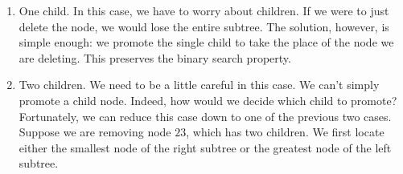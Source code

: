 \begin{enumerate}
\item One child.
In this case, we have to worry about children.
If we were to just delete the node, we would lose the entire subtree.
The solution, however, is simple enough: we promote the single child to take the place of the node we are deleting.
This preserves the binary search property.
\begin{center}
\begin{minipage}{0.3\textwidth}
\end{minipage}
\begin{minipage}{0.2\textwidth}
   \begin{center}
   \end{center}
\end{minipage}
\begin{minipage}{0.3\textwidth}
\end{minipage}
\end{center}
\item Two children.
We need to be a little careful in this case.
We can't simply promote a child node.
Indeed, how would we decide which child to promote?
Fortunately, we can reduce this case down to one of the previous two cases.
Suppose we are removing node $23$, which has two children.
We first locate either the smallest node of the right subtree or the greatest node of the left subtree.

\end{enumerate}
